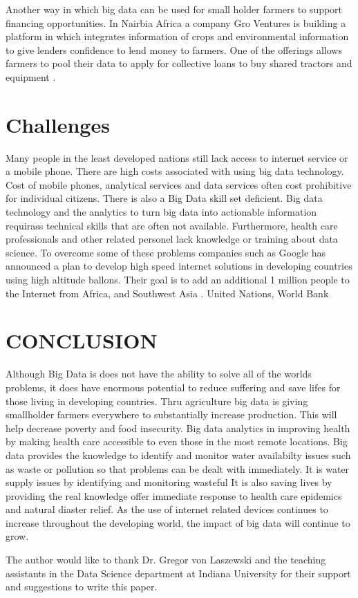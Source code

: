 \documentclass[sigconf]{acmart}
\begin{document}
Another way in which big data can be used for small holder farmers to support financing opportunities. In Nairbia Africa a company Gro Ventures is building a platform in which integrates information of crops and environmental information to give lenders confidence to lend money to farmers. One of the offerings allows farmers to pool their data to apply for collective loans to buy shared tractors and equipment \cite{www-google-Hffpst}.   

\section{Challenges}
Many people in the least developed nations still lack access to internet service or a mobile phone. There are high costs associated with using big data technology. Cost of mobile phones, analytical services and data services often cost prohibitive for individual citizens. There is also a Big Data skill set deficient. Big data technology and the analytics to turn big data into actionable information requirass technical skills that are often not available. Furthermore, health care professionals and other related personel lack knowledge or training about data science. 
To overcome some of these problems companies such as Google has announced a plan to develop high speed internet solutions in developing countries using high altitude ballons. Their goal is to add an additional 1 million people to the Internet from Africa,  and Southwest Asia \cite{DevEcon}. 
United Nations, World Bank	




 





\section{CONCLUSION}


Although Big Data is does not have the ability to solve all of the worlds problems, it does have enormous potential to reduce suffering and save lifes for those living in developing countries. Thru agriculture big data is giving smallholder farmers everywhere to substantially increase production. This will help decrease poverty and food insecurity. Big data analytics in improving health by making health care accessible to even those in the most remote locations. Big data provides the knowledge to identify and monitor water availabilty issues such as waste or pollution so that problems can be dealt with immediately. It is water supply issues by identifying and monitoring wasteful  It is also saving lives by providing the real knowledge offer immediate response to health care epidemics and natural diaster relief. As the use of internet related devices continues to increase throughout the developing world, the impact of big data will continue to grow.   







\begin{acks}

  The author would like to thank Dr. Gregor von Laszewski and the teaching assistants in the Data Science department at Indiana  University for their support and suggestions to write this paper.

\end{acks}




 
\end{document}

